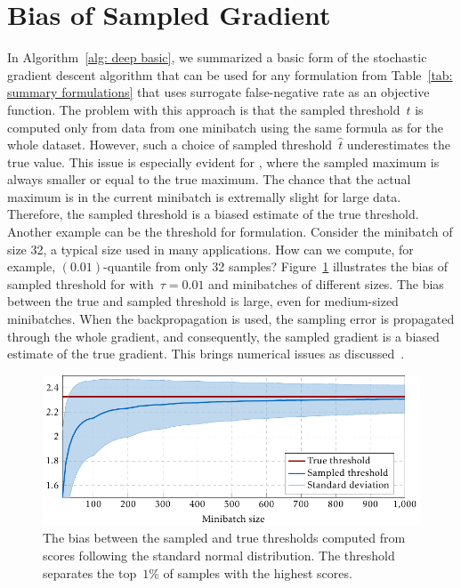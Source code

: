 \section{Bias of Sampled Gradient}\label{sec: bias sampled gradient}

In Algorithm~\eqref{alg: deep basic}, we summarized a basic form of the stochastic gradient descent algorithm that can be used for any formulation from Table~\ref{tab: summary formulations} that uses surrogate false-negative rate as an objective function. The problem with this approach is that the sampled threshold~$\hat{t}$ is computed only from data from one minibatch using the same formula as for the whole dataset. However, such a choice of sampled threshold~$\hat{t}$ underestimates the true value. This issue is especially evident for \TopPush, where the sampled maximum is always smaller or equal to the true maximum. The chance that the actual maximum is in the current minibatch is extremally slight for large data. Therefore, the sampled threshold is a biased estimate of the true threshold. Another example can be the threshold for \PatMat formulation. Consider the minibatch of size 32, a typical size used in many applications. How can we compute, for example, $(0.01)$-quantile from only 32 samples? Figure~\ref{fig:thresholds1} illustrates the bias of sampled threshold for \PatMat with~$\tau=0.01$ and minibatches of different sizes. The bias between the true and sampled threshold is large, even for medium-sized minibatches. When the backpropagation is used, the sampling error is propagated through the whole gradient, and consequently, the sampled gradient is a biased estimate of the true gradient. This brings numerical issues as discussed~\cite{bottou2018optimization}.

\begin{figure}
  \centering
  \includegraphics{images/deep_threshold_bias.pdf}
  \caption{The bias between the sampled and true thresholds computed from scores following the standard normal distribution. The threshold separates the top~$1\%$ of samples with the highest scores.}
  \label{fig:thresholds1}
\end{figure}

